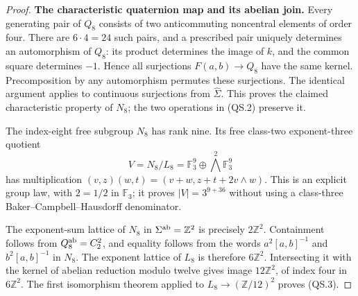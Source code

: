 \begin{proof}
\textbf{The characteristic quaternion map and its abelian join.}
Every generating pair of $Q_8$ consists of two anticommuting
noncentral elements of order four.  There are $6\cdot4=24$
such pairs, and a prescribed pair uniquely determines an
automorphism of $Q_8$: its product determines the image of $k$,
and the common square determines $-1$.  Hence all surjections
$F(a,b)\to Q_8$ have the same kernel.  Precomposition by any
automorphism permutes these surjections.  The identical argument
applies to continuous surjections from $\widehat\Sigma$.
This proves the claimed characteristic property of $N_8$;
the two operations in (QS.2) preserve it.

The index-eight free subgroup $N_8$ has rank nine.  Its free
class-two exponent-three quotient
\[
 V=N_8/L_8
   =\mathbb F_3^9\oplus\bigwedge^2\mathbb F_3^9
                                                        \tag{QS.6}
\]
has multiplication $(v,z)(w,t)=(v+w,z+t+2v\wedge w)$.
This is an explicit group law, with $2=1/2$ in $\mathbb F_3$;
it proves $|V|=3^{9+36}$ without using a class-three
Baker--Campbell--Hausdorff denominator.

The exponent-sum lattice of $N_8$ in $\Sigma^{\rm ab}=\mathbb Z^2$
is precisely $2\mathbb Z^2$.  Containment follows from
$Q_8^{\rm ab}=C_2^2$, and equality follows from the words
$a^2[a,b]^{-1}$ and $b^2[a,b]^{-1}$ in $N_8$.
The exponent lattice of $L_8$ is therefore $6\mathbb Z^2$.
Intersecting it with the kernel of abelian reduction modulo
twelve gives image $12\mathbb Z^2$, of index four in
$6\mathbb Z^2$.  The first isomorphism theorem applied to
$L_8\to(\mathbb Z/12)^2$ proves (QS.3).


\end{proof}
